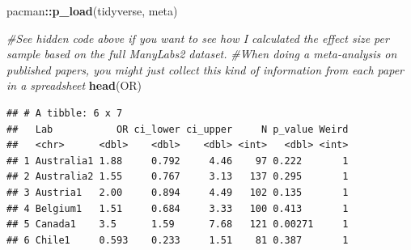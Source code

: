 \documentclass[
]{book}
\newenvironment{Shaded}{\begin{snugshade}}{\end{snugshade}}
\newcommand{\CommentTok}[1]{\textcolor[rgb]{0.56,0.35,0.01}{\textit{#1}}}
\newcommand{\DataTypeTok}[1]{\textcolor[rgb]{0.13,0.29,0.53}{#1}}
\newcommand{\DecValTok}[1]{\textcolor[rgb]{0.00,0.00,0.81}{#1}}
\newcommand{\KeywordTok}[1]{\textcolor[rgb]{0.13,0.29,0.53}{\textbf{#1}}}
\newcommand{\NormalTok}[1]{#1}
\newcommand{\OperatorTok}[1]{\textcolor[rgb]{0.81,0.36,0.00}{\textbf{#1}}}
\newcommand{\StringTok}[1]{\textcolor[rgb]{0.31,0.60,0.02}{#1}}
\begin{document}
\begin{Shaded}
\begin{Highlighting}[]
\NormalTok{pacman}\OperatorTok{::}\KeywordTok{p_load}\NormalTok{(tidyverse, meta)}

\CommentTok{#See hidden code above if you want to see how I calculated the effect size per sample based on the full ManyLabs2 dataset. }
\CommentTok{#When doing a meta-analysis on published papers, you might just collect this kind of information from each paper in a spreadsheet}
\KeywordTok{head}\NormalTok{(OR)}
\end{Highlighting}
\end{Shaded}

\begin{verbatim}
## # A tibble: 6 x 7
##   Lab           OR ci_lower ci_upper     N p_value Weird
##   <chr>      <dbl>    <dbl>    <dbl> <int>   <dbl> <int>
## 1 Australia1 1.88     0.792     4.46    97 0.222       1
## 2 Australia2 1.55     0.767     3.13   137 0.295       1
## 3 Austria1   2.00     0.894     4.49   102 0.135       1
## 4 Belgium1   1.51     0.684     3.33   100 0.413       1
## 5 Canada1    3.5      1.59      7.68   121 0.00271     1
## 6 Chile1     0.593    0.233     1.51    81 0.387       1
\end{verbatim}

\begin{Shaded}
\end{Shaded}
\end{document}
